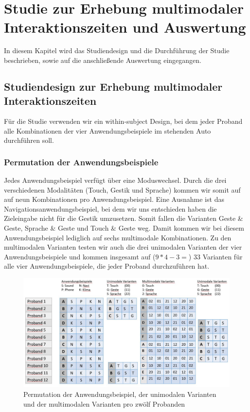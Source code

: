 \chapter[Studie und Auswertung]{Studie zur Erhebung multimodaler Interaktionszeiten und Auswertung}\label{cha:Studie}
In diesem Kapitel wird das Studiendesign und die Durchführung der Studie beschrieben, sowie auf die anschließende Auswertung eingegangen.

\section[Studiendesign]{Studiendesign zur Erhebung multimodaler Interaktionszeiten}
Für die Studie verwenden wir ein within-subject Design, bei dem jeder Proband alle Kombinationen der vier Anwendungsbeispiele im stehenden Auto durchführen soll.

\subsection[Permutation]{Permutation der Anwendungsbeispiele}
Jedes Anwendungsbeispiel verfügt über eine Moduswechsel.
Durch die drei verschiedenen Modalitäten (Touch, Gestik und Sprache) kommen wir somit auf auf neun Kombinationen pro Anwendungsbeispiel. 
Eine Ausnahme ist das Navigationsanwendungsbeispiel, bei dem wir uns entschieden haben die Zieleingabe nicht für die Gestik umzusetzen. 
Somit fallen die Varianten Geste \& Geste, Sprache \& Geste und Touch \& Geste weg. 
Damit kommen wir bei diesem Anwendungsbeispiel lediglich auf sechs multimodale Kombinationen. 
Zu den multimodalen Varianten testen wir auch die drei unimodalen Varianten der vier Anwendungsbeispiele und kommen insgesamt auf ($9*4-3=$) 33 Varianten für alle vier Anwendungsbeispiele, die jeder Proband durchzuführen hat. 
\begin{figure}[ht]
  \centering
  \includegraphics[width=1\textwidth]{img/Permutation.jpg}
  \caption[Permutation der Anwendungsbeispiel]{Permutation der Anwendungsbeispiel, der unimodalen Varianten und der multimodalen Varianten pro zwölf Probanden}
  \label{fig:Permutation}
\end{figure} 

